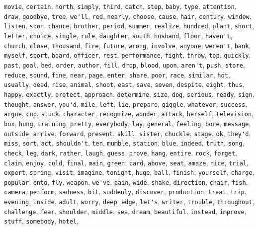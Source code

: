\verb|movie|, \verb|certain|, \verb|north|, \verb|simply|, \verb|third|, \verb|catch|, \verb|step|, \verb|baby|, \verb|type|, \verb|attention|, \verb|draw|, \verb|goodbye|, \verb|tree|, \verb|we'll|, \verb|red|, \verb|nearly|, \verb|choose|, \verb|cause|, \verb|hair|, \verb|century|, \verb|window|, \verb|listen|, \verb|soon|, \verb|chance|, \verb|brother|, \verb|period|, \verb|summer|, \verb|realize|, \verb|hundred|, \verb|plant|, \verb|short|, \verb|letter|, \verb|choice|, \verb|single|, \verb|rule|, \verb|daughter|, \verb|south|, \verb|husband|, \verb|floor|, \verb|haven't|, \verb|church|, \verb|close|, \verb|thousand|, \verb|fire|, \verb|future|, \verb|wrong|, \verb|involve|, \verb|anyone|, \verb|weren't|, \verb|bank|, \verb|myself|, \verb|sport|, \verb|board|, \verb|officer|, \verb|rest|, \verb|performance|, \verb|fight|, \verb|throw|, \verb|top|, \verb|quickly|, \verb|past|, \verb|goal|, \verb|bed|, \verb|order|, \verb|author|, \verb|fill|, \verb|drop|, \verb|blood|, \verb|upon|, \verb|aren't|, \verb|push|, \verb|store|, \verb|reduce|, \verb|sound|, \verb|fine|, \verb|near|, \verb|page|, \verb|enter|, \verb|share|, \verb|poor|, \verb|race|, \verb|similar|, \verb|hot|, \verb|usually|, \verb|dead|, \verb|rise|, \verb|animal|, \verb|shoot|, \verb|east|, \verb|save|, \verb|seven|, \verb|despite|, \verb|eight|, \verb|thus|, \verb|happy|, \verb|exactly|, \verb|protect|, \verb|approach|, \verb|determine|, \verb|size|, \verb|dog|, \verb|serious|, \verb|ready|, \verb|sign|, \verb|thought|, \verb|answer|, \verb|you'd|, \verb|mile|, \verb|left|, \verb|lie|, \verb|prepare|, \verb|giggle|, \verb|whatever|, \verb|success|, \verb|argue|, \verb|cup|, \verb|stuck|, \verb|character|, \verb|recognize|, \verb|wonder|, \verb|attack|, \verb|herself|, \verb|television|, \verb|box|, \verb|hung|, \verb|training|, \verb|pretty|, \verb|everybody|, \verb|lay|, \verb|general|, \verb|feeling|, \verb|bore|, \verb|message|, \verb|outside|, \verb|arrive|, \verb|forward|, \verb|present|, \verb|skill|, \verb|sister|, \verb|chuckle|, \verb|stage|, \verb|ok|, \verb|they'd|, \verb|miss|, \verb|sort|, \verb|act|, \verb|shouldn't|, \verb|ten|, \verb|mumble|, \verb|station|, \verb|blue|, \verb|indeed|, \verb|truth|, \verb|song|, \verb|check|, \verb|leg|, \verb|dark|, \verb|rather|, \verb|laugh|, \verb|guess|, \verb|prove|, \verb|hang|, \verb|entire|, \verb|rock|, \verb|forget|, \verb|claim|, \verb|enjoy|, \verb|cold|, \verb|final|, \verb|main|, \verb|green|, \verb|card|, \verb|above|, \verb|seat|, \verb|amaze|, \verb|nice|, \verb|trial|, \verb|expert|, \verb|spring|, \verb|visit|, \verb|imagine|, \verb|tonight|, \verb|huge|, \verb|ball|, \verb|finish|, \verb|yourself|, \verb|charge|, \verb|popular|, \verb|onto|, \verb|fly|, \verb|weapon|, \verb|we've|, \verb|pain|, \verb|wide|, \verb|shake|, \verb|direction|, \verb|chair|, \verb|fish|, \verb|camera|, \verb|perform|, \verb|sadness|, \verb|bit|, \verb|suddenly|, \verb|discover|, \verb|production|, \verb|treat|, \verb|trip|, \verb|evening|, \verb|inside|, \verb|adult|, \verb|worry|, \verb|deep|, \verb|edge|, \verb|let's|, \verb|writer|, \verb|trouble|, \verb|throughout|, \verb|challenge|, \verb|fear|, \verb|shoulder|, \verb|middle|, \verb|sea|, \verb|dream|, \verb|beautiful|, \verb|instead|, \verb|improve|, \verb|stuff|, \verb|somebody|, \verb|hotel|, 